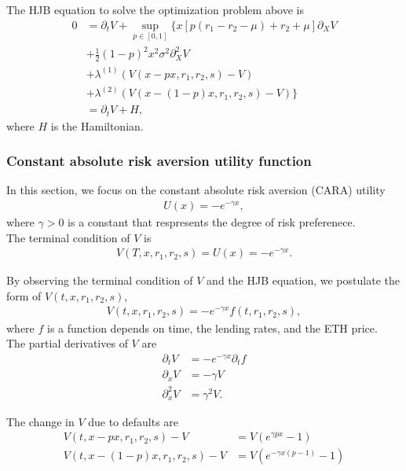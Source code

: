 \documentclass[square]{article} %
\theoremstyle{plain}
\theoremstyle{definition} %
\begin{document}
The HJB equation to solve the optimization problem above is
\begin{align*}
0&=\partial_t V + \sup_{p\in[0,1]}
\Big\{
x\left[p \left(r_1 - r_2 - \mu \right)+r_2 + \mu \right]\partial_X V\\
&+ \frac{1}{2} (1-p)^2x^2\sigma^2 \partial_X^2 V \\ 
&+\lambda^{(1)}\left(V(x-px, r_1, r_2, s) - V\right)\\
&+\lambda^{(2)}\left(V(x-(1-p)x, r_1, r_2, s) - V\right)
\Big\}\\
&=\partial_t V + H,
\end{align*}
where $H$ is the Hamiltonian. \\

\subsubsection{Constant absolute risk aversion utility function}
In this section, we focus on the constant absolute risk aversion (CARA) utility 
\begin{align*}
U(x) = -e^{-\gamma x},
\end{align*}
where $\gamma>0$ is a constant that respresents the degree of risk preferenece.\\

The terminal condition of $V$ is
\begin{align*}
  V(T, x, r_1, r_2, s) = U(x) = -e^{-\gamma x}.
\end{align*}


By observing the terminal condition of $V$ and the HJB equation, we postulate the form of $V(t, x, r_1, r_2, s)$, 
\begin{align*}
V(t, x, r_1, r_2, s) = -e^{-\gamma x}f(t, r_1, r_2, s),
\end{align*}
where $f$ is a function depends on time, the lending rates, and the ETH price. \\

The partial derivatives of $V$ are
\begin{align*}
\partial_t V &= -e^{-\gamma x}\partial_t f\\
\partial_x V &= -\gamma V\\
\partial^2_x V &= \gamma^2 V.
\end{align*}

The change in $V$ due to defaults are
\begin{align*}
V(t, x-px, r_1, r_2, s) - V &= V\left(e^{\gamma px}-1\right) \\
V(t, x-(1-p)x, r_1, r_2, s) - V &= V \left(e^{-\gamma x (p-1)}-1\right) \\
\end{align*}
\end{document}
